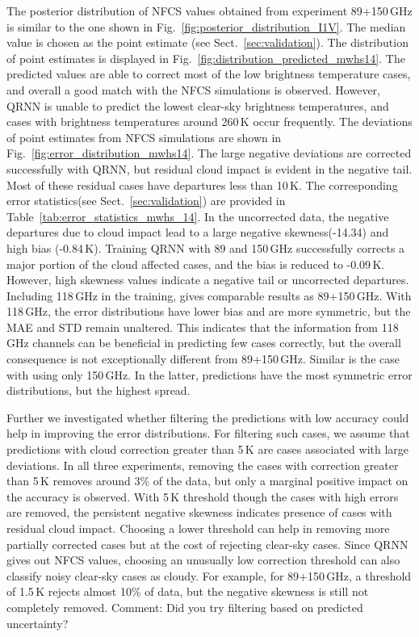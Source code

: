 \documentclass[amt, manuscript]{copernicus}
\newcommand{\todo}[1]{{\color{red} #1}}
\begin{document}
The posterior distribution of NFCS values obtained from experiment 89+150\,GHz
is similar to the one shown in Fig.~\ref{fig:posterior_distribution_I1V}. The
median value is chosen as the point estimate (see Sect.~\ref{sec:validation}).
The distribution of point estimates is displayed in
Fig.~\ref{fig:distribution_predicted_mwhs14}. The predicted values are able to
correct most of the low brightness temperature cases, and overall a good match
with the NFCS simulations is observed. However, QRNN is unable to predict the
lowest clear-sky brightness temperatures, and cases with brightness temperatures
around 260\,K occur frequently. The deviations of point estimates from NFCS
simulations are shown in Fig.~\ref{fig:error_distribution_mwhs14}. The large
negative deviations are corrected successfully with QRNN, but residual cloud
impact is evident in the negative tail. Most of these residual cases have
departures less than 10\,K. The corresponding error statistics(see
Sect.~\ref{sec:validation}) are provided in
Table~\ref{tab:error_statistics_mwhs_14}. In the uncorrected data, the negative
departures due to cloud impact lead to a large negative skewness(-14.34) and
high bias (-0.84\,K). Training QRNN with 89 and 150\,GHz successfully corrects a
major portion of the cloud affected cases, and the bias is reduced to -0.09\,K.
However, high skewness values indicate a negative tail or uncorrected
departures. Including 118\,GHz in the training, gives comparable results as
89+150\,GHz. With 118\,GHz, the error distributions have lower bias and are more
symmetric, but the MAE and STD remain unaltered. This indicates that the
information from 118\,GHz channels can be beneficial in predicting few cases
correctly, but the overall consequence is not exceptionally different from
89+150\,GHz. Similar is the case with using only 150\,GHz. In the latter,
predictions have the most symmetric error distributions, but the highest spread.

Further we investigated whether filtering the predictions with low accuracy
could help in improving the error distributions. For filtering such cases, we
assume that predictions with cloud correction greater than 5\,K are cases
associated with large deviations. In all three experiments, removing the cases
with correction greater than 5\,K removes around 3\% of the data, but only a
marginal positive impact on the accuracy is observed. With 5\,K threshold though
the cases with high errors are removed, the persistent negative skewness
indicates presence of cases with residual cloud impact. Choosing a lower
threshold can help in removing more partially corrected cases but at the cost of
rejecting clear-sky cases. Since QRNN gives out NFCS values, choosing an
unusually low correction threshold can also classify noisy clear-sky cases as
cloudy. For example, for 89+150\,GHz, a threshold of 1.5\,K rejects almost 10\%
of data, but the negative skewness is still not completely removed.
\todo{Comment: Did you try filtering based on predicted uncertainty?}
\end{document}
